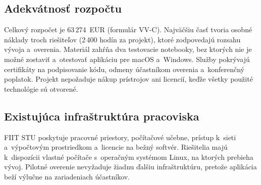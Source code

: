 \documentclass[11pt,a4paper]{article}
\begin{document}
\subsection{Adekvátnosť rozpočtu}

Celkový rozpočet je 63\,274~EUR (formulár VV-C). Najväčšiu časť tvoria
osobné náklady troch riešiteľov (2\,400 hodín za projekt), ktoré
zodpovedajú rozsahu vývoja a~overenia. Materiál zahŕňa dva testovacie
notebooky, bez ktorých nie je možné zostaviť a~otestovať aplikáciu pre
macOS a~Windows. Služby pokrývajú certifikáty na podpisovanie kódu,
odmeny účastníkom overenia a~konferenčný poplatok. Projekt nepožaduje
nákup prístrojov ani licencií, keďže všetky použité technológie sú
otvorené.

\subsection{Existujúca infraštruktúra pracoviska}

FIIT STU poskytuje pracovné priestory, počítačové učebne, prístup
k~sieti a~výpočtovým prostriedkom a~licencie na bežný softvér.
Riešitelia majú k~dispozícii vlastné počítače s~operačným systémom
Linux, na ktorých prebieha vývoj. Pilotné overenie nevyžaduje žiadnu
ďalšiu infraštruktúru, pretože aplikácia beží výlučne na zariadeniach
účastníkov.



\end{document}
